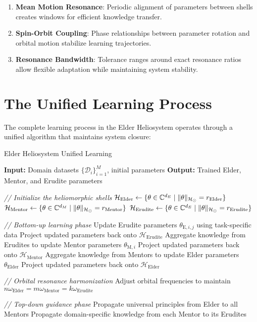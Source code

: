 \begin{enumerate}
    \item \textbf{Mean Motion Resonance}: Periodic alignment of parameters between shells creates windows for efficient knowledge transfer.
    
    \item \textbf{Spin-Orbit Coupling}: Phase relationships between parameter rotation and orbital motion stabilize learning trajectories.
    
    \item \textbf{Resonance Bandwidth}: Tolerance ranges around exact resonance ratios allow flexible adaptation while maintaining system stability.
\end{enumerate}

\section{The Unified Learning Process}

The complete learning process in the Elder Heliosystem operates through a unified algorithm that maintains system closure:

\begin{algorithm}
\caption{Elder Heliosystem Unified Learning}
\begin{algorithmic}[1]
\State \textbf{Input:} Domain datasets $\{\mathcal{D}_i\}_{i=1}^M$, initial parameters 
\State \textbf{Output:} Trained Elder, Mentor, and Erudite parameters

\State \textit{// Initialize the heliomorphic shells}
\State $\mathcal{H}_{\text{Elder}} \gets \{\theta \in \mathbb{C}^{d_E} \mid \|\theta\|_{\mathcal{H}_{\odot}} = r_{\text{Elder}}\}$
\State $\mathcal{H}_{\text{Mentor}} \gets \{\theta \in \mathbb{C}^{d_M} \mid \|\theta\|_{\mathcal{H}_{\odot}} = r_{\text{Mentor}}\}$
\State $\mathcal{H}_{\text{Erudite}} \gets \{\theta \in \mathbb{C}^{d_E} \mid \|\theta\|_{\mathcal{H}_{\odot}} = r_{\text{Erudite}}\}$

    \State \textit{// Bottom-up learning phase}
            \State Update Erudite parameters $\theta_{\text{E},i,j}$ using task-specific data
            \State Project updated parameters back onto $\mathcal{H}_{\text{Erudite}}$
        \EndFor
        \State Aggregate knowledge from Erudites to update Mentor parameters $\theta_{\text{M},i}$
        \State Project updated parameters back onto $\mathcal{H}_{\text{Mentor}}$
    \EndFor
    \State Aggregate knowledge from Mentors to update Elder parameters $\theta_{\text{Elder}}$
    \State Project updated parameters back onto $\mathcal{H}_{\text{Elder}}$
    
    \State \textit{// Orbital resonance harmonization}
    \State Adjust orbital frequencies to maintain $n\omega_{\text{Elder}} = m\omega_{\text{Mentor}} = k\omega_{\text{Erudite}}$
    
    \State \textit{// Top-down guidance phase}
    \State Propagate universal principles from Elder to all Mentors
    \State Propagate domain-specific knowledge from each Mentor to its Erudites
\EndFor
\end{algorithmic}
\end{algorithm}

